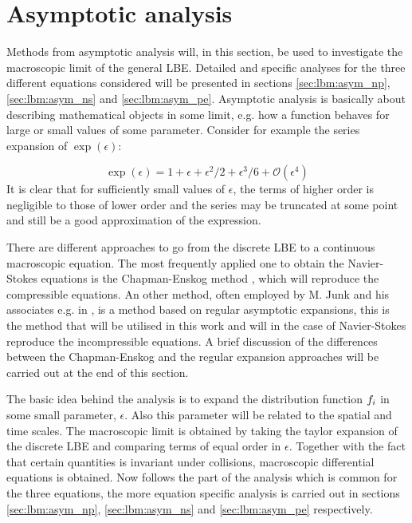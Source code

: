 \section{Asymptotic analysis}\label{sec:lbm:asym}
Methods from asymptotic analysis will, in this section, be used to
investigate the macroscopic limit of the general LBE. Detailed and
specific analyses for the three different equations considered will be
presented in sections \ref{sec:lbm:asym_np}, \ref{sec:lbm:asym_ns} and
\ref{sec:lbm:asym_pe}. Asymptotic analysis is basically about
describing mathematical objects in some limit, e.g. how a function
behaves for large or small values of some parameter. Consider for
example the series expansion of $\exp(\epsilon)$:

\begin{equation}
\exp(\epsilon) = 1 + \epsilon + \epsilon^2/2 + \epsilon^3/6 + \mathcal{O}(\epsilon^4) 
\end{equation}
It is clear that for sufficiently small values of $\epsilon$, the
terms of higher order is negligible to those of lower order and the
series may be truncated at some point and still be a good
approximation of the expression.

There are different approaches to go from the discrete LBE to a
continuous macroscopic equation. The most frequently applied one to
obtain the Navier-Stokes equations is the Chapman-Enskog method
\cite{junk-boundary}, which will reproduce the compressible
equations. An other method, often employed by M. Junk and his
associates e.g. in \cite{junk-asym}, is a method based on regular
asymptotic expansions, this is the method that will be utilised in
this work and will in the case of Navier-Stokes reproduce the
incompressible equations. A brief discussion of the differences between
the Chapman-Enskog and the regular expansion approaches will be carried
out at the end of this section.

The basic idea behind the analysis is to expand the distribution
function $f_i$ in some small parameter, $\epsilon$. Also this
parameter will be related to the spatial and time scales. The
macroscopic limit is obtained by taking the taylor expansion of the
discrete LBE and comparing terms of equal order in
$\epsilon$. Together with the fact that certain quantities is
invariant under collisions, macroscopic differential equations is
obtained. Now follows the part of the analysis which is common for the
three equations, the more equation specific analysis is carried out in
sections \ref{sec:lbm:asym_np}, \ref{sec:lbm:asym_ns} and
\ref{sec:lbm:asym_pe} respectively.

